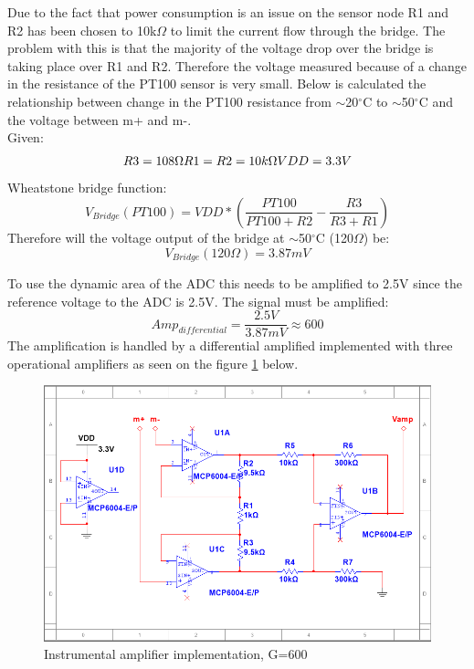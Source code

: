 Due to the fact that power consumption is an issue on the sensor node R1 and R2 has been chosen to 10k$\Omega$ to limit the current flow through the bridge. The problem with this is that the majority of the voltage drop over the bridge is taking place over R1 and R2. Therefore the voltage measured because of a change in the resistance of the PT100 sensor is very small. Below is calculated the relationship between change in the PT100 resistance from $\sim$20$^\circ$C to $\sim$50$^\circ$C and the voltage between m+ and m-.\\
Given:
\begin{equation}
		R3=108\Omega $\\$ R1=R2=10k\Omega $\\$ VDD=3.3V
\end{equation}
Wheatstone bridge function:
\begin{equation}
		V_{Bridge}(PT100)=VDD*\left(\frac{PT100}{PT100+R2}-\frac{R3}{R3+R1}\right)
		\label{eq:vbridge}
\end{equation}
Therefore will the voltage output of the bridge at $\sim$50$^\circ$C (120$\Omega$) be:
\begin{equation}
	V_{Bridge}(120\Omega)= 3.87mV
\end{equation}

To use the dynamic area of the ADC this needs to be amplified to 2.5V since the reference voltage to the ADC is 2.5V. The signal must be amplified:
\begin{equation}
	Amp_{differential}=\frac{2.5V}{3.87mV}\approx600
\end{equation}
The amplification is handled by a differential amplified implemented with three operational amplifiers as seen on the figure \ref{fig:inst_amp_imp} below.

\begin{figure}[H]
	\centering
	\includegraphics[width=.7\textwidth]{billeder/diff_amp_imp}
	\caption{Instrumental amplifier implementation, G=600}
	\label{fig:inst_amp_imp}
\end{figure}

